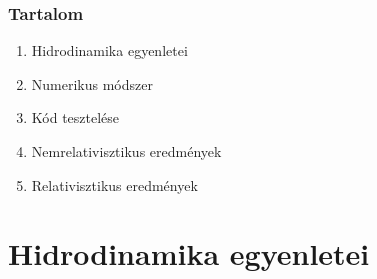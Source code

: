 \documentclass{beamer}
\begin{document}
\begin{frame}
\frametitle{Tartalom}
\begin{enumerate}
  \setlength{\itemsep}{16pt}
\item<1-> Hidrodinamika egyenletei
\item<1-> Numerikus módszer
\item<1-> Kód tesztelése
\item<1-> Nemrelativisztikus eredmények
\item<1-> Relativisztikus eredmények
\end{enumerate}

\end{frame}

\section{Hidrodinamika egyenletei}
\end{document}
